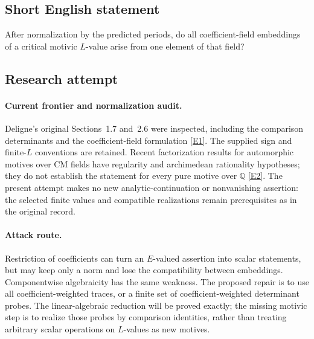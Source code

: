 \documentclass[11pt,a4paper]{article}
\numberwithin{equation}{section}
\newcommand{\Q}{\mathbb{Q}}
\newcommand{\eref}[2]{\hyperlink{extra:#1:#2}{[E#2]}}
\begin{document}
\subsection{Short English statement}
After normalization by the predicted periods, do all coefficient-field embeddings of a critical motivic $L$-value arise from one element of that field?
\subsection{Research attempt}

\paragraph{Current frontier and normalization audit.}
Deligne's original Sections~1.7 and~2.6 were inspected, including the
comparison determinants and the coefficient-field formulation
\eref{statement}{1}. The supplied sign and finite-$L$ conventions are retained.
Recent factorization results for automorphic motives over CM fields have
regularity and archimedean rationality hypotheses; they do not establish
the statement for every pure motive over $\Q$ \eref{statement}{2}.
The present attempt makes no new analytic-continuation or nonvanishing
assertion: the selected finite values and compatible realizations remain
prerequisites as in the original record.

\paragraph{Attack route.}
Restriction of coefficients can turn an $E$-valued assertion into scalar
statements, but may keep only a norm and lose the compatibility between
embeddings. Componentwise algebraicity has the same weakness. The proposed
repair is to use all coefficient-weighted traces, or a finite set of
coefficient-weighted determinant probes. The linear-algebraic reduction
will be proved exactly; the missing motivic step is to realize those probes
by comparison identities, rather than treating arbitrary scalar operations
on $L$-values as new motives.
\end{document}
